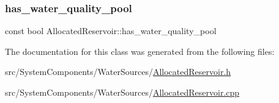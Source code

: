 \subsubsection{\texorpdfstring{has\+\_\+water\+\_\+quality\+\_\+pool}{has\_water\_quality\_pool}}
{\footnotesize\ttfamily const bool Allocated\+Reservoir\+::has\+\_\+water\+\_\+quality\+\_\+pool\hspace{0.3cm}{\ttfamily [protected]}}



The documentation for this class was generated from the following files\+:\begin{DoxyCompactItemize}
\item 
src/\+System\+Components/\+Water\+Sources/\mbox{\hyperlink{AllocatedReservoir_8h}{Allocated\+Reservoir.\+h}}\item 
src/\+System\+Components/\+Water\+Sources/\mbox{\hyperlink{AllocatedReservoir_8cpp}{Allocated\+Reservoir.\+cpp}}\end{DoxyCompactItemize}
